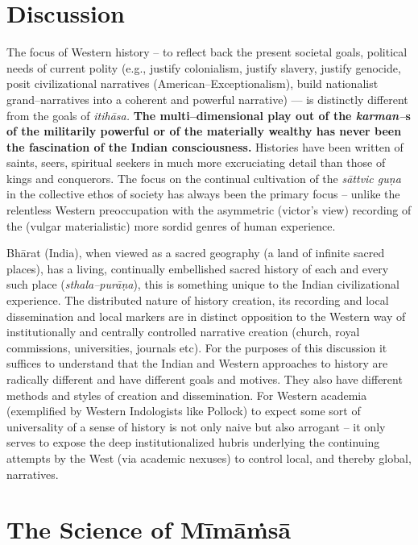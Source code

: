 \section*{Discussion}

The focus of Western history – to reflect back the present societal goals, political needs of current polity (e.g., justify colonialism, justify slavery, justify genocide, posit civilizational narratives (American–Exceptionalism), build nationalist grand–narratives into a coherent and powerful narrative) — is distinctly different from the goals of \textit{itihāsa.} \textbf{The multi–dimensional play out of the \textit{karman–}s of the militarily powerful or of the materially wealthy has never been the fascination of the Indian consciousness.} Histories have been written of saints, seers, spiritual seekers in much more excruciating detail than those of kings and conquerors. The focus on the continual cultivation of the \textit{sāttvic guṇa} in the collective ethos of society has always been the primary focus – unlike the relentless Western preoccupation with the asymmetric (victor’s view) recording of the (vulgar materialistic) more sordid genres of human experience.

Bhārat (India), when viewed as a sacred geography (a land of infinite sacred places), has a living, continually embellished sacred history of each and every such place (\textit{sthala–purāṇa}), this is something unique to the Indian civilizational experience. The distributed nature of history creation, its recording and local dissemination and local markers are in distinct opposition to the Western way of institutionally and centrally controlled narrative creation (church, royal commissions, universities, journals etc). For the purposes of this discussion it suffices to understand that the Indian and Western approaches to history are radically different and have different goals and motives. They also have different methods and styles of creation and dissemination. For Western academia (exemplified by Western Indologists like Pollock) to expect some sort of universality of a sense of history is not only naive but also arrogant – it only serves to expose the deep institutionalized hubris underlying the continuing attempts by the West (via academic nexuses) to control local, and thereby global, narratives.


\section*{The Science of Mīmāṁsā}

